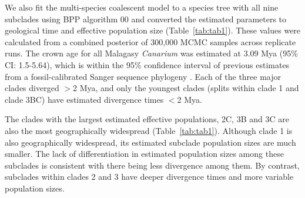\documentclass[10pt,letterpaper]{article}
\begin{document}
We also fit the multi-species coalescent model to a species tree with all nine subclades using BPP algorithm 00 and converted the estimated parameters to geological time and effective population size (Table~\ref{tab:tab1}). These values were calculated from a combined posterior of 300,000 MCMC samples across replicate runs. The crown age for all Malagasy \emph{Canarium} was estimated at 3.09 Mya (95\% CI: 1.5-5.64), which is within the 95\% confidence interval of previous estimates from a fossil-calibrated Sanger sequence phylogeny 
\cite{federman_biogeographic_2015}. Each of the three major clades diverged $>$2 Mya, and only the youngest clades (splits within clade 1 and clade 3BC) have estimated divergence times $<$2 Mya.   

The clades with the largest estimated effective populations, 2C, 3B and 3C are also the most geographically widespread (Table~\ref{tab:tab1}). Although clade 1 is also geographically widespread, its estimated subclade population sizes are much smaller. The lack of differentiation in estimated population sizes among these subclades is consistent with there being less divergence among them. By contrast, subclades within clades 2 and 3 have deeper divergence times and more variable population sizes.
\end{document}
